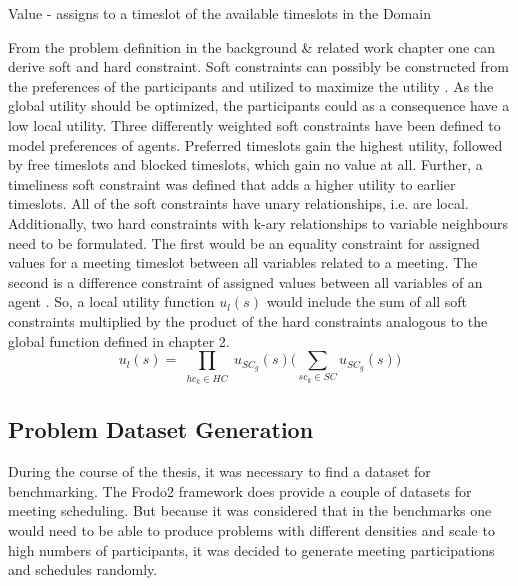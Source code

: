 \begin{hardconstraint2}
Value - assigns to a timeslot of the available timeslots in the Domain
\end{hardconstraint2}
From the problem definition in the background \& related work chapter one can derive soft and hard constraint. Soft constraints can possibly be constructed from the preferences of the participants and utilized to maximize the utility \cite{Franzin}. As the global utility should be optimized, the participants could as a consequence have a low local utility. Three differently weighted soft constraints have been defined to model preferences of agents. Preferred timeslots gain the highest utility, followed by free timeslots and blocked timeslots, which gain no value at all. Further, a timeliness soft constraint was defined that adds a higher utility to earlier timeslots. All of the soft constraints have unary relationships, i.e. are local. %
Additionally, two hard constraints with k-ary relationships to variable neighbours need to be formulated. The first would be an equality constraint for assigned values for a meeting timeslot between all variables related to a meeting. The second is a difference constraint of assigned values between all variables of an agent \cite{Farinelli, Angulo}.
\newline\newline
So, a local utility function \(u_{l}(s)\) would include the sum of all soft constraints multiplied by the product of the hard constraints analogous to the global function defined in chapter 2.
\[ u_{l}(s) = \prod_{\substack{hc_{k} \in HC}} u_{SC_{g}}(s) \bigg( \sum_{sc_{k} \in SC} u_{SC_{g}}(s) \bigg)\] 


\subsection{Problem Dataset Generation}

During the course of the thesis, it was necessary to find a dataset for benchmarking. The Frodo2 framework does provide a couple of datasets for meeting scheduling. But because it was considered that in the benchmarks one would need to be able to produce problems with different densities and scale to high numbers of participants, it was decided to generate meeting participations and schedules randomly.


